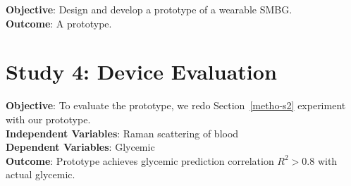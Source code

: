 \textbf{Objective}: Design and develop a prototype of a wearable SMBG.\\
\textbf{Outcome}: A prototype.

\section{Study 4: Device Evaluation}

\textbf{Objective}: To evaluate the prototype, we redo Section~\ref{metho-s2} experiment with our prototype.\\
\textbf{Independent Variables}: Raman scattering of blood\\
\textbf{Dependent Variables}: Glycemic\\
\textbf{Outcome}: Prototype achieves glycemic prediction correlation $R^2 > 0.8$ with actual glycemic.
